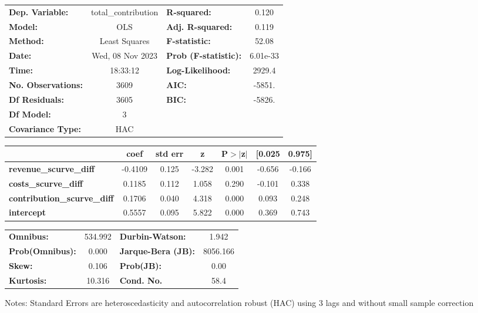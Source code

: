 \begin{center}
\begin{tabular}{lclc}
\toprule
\textbf{Dep. Variable:}             & total\_contribution & \textbf{  R-squared:         } &     0.120   \\
\textbf{Model:}                     &         OLS         & \textbf{  Adj. R-squared:    } &     0.119   \\
\textbf{Method:}                    &    Least Squares    & \textbf{  F-statistic:       } &     52.08   \\
\textbf{Date:}                      &   Wed, 08 Nov 2023  & \textbf{  Prob (F-statistic):} &  6.01e-33   \\
\textbf{Time:}                      &       18:33:12      & \textbf{  Log-Likelihood:    } &    2929.4   \\
\textbf{No. Observations:}          &          3609       & \textbf{  AIC:               } &    -5851.   \\
\textbf{Df Residuals:}              &          3605       & \textbf{  BIC:               } &    -5826.   \\
\textbf{Df Model:}                  &             3       & \textbf{                     } &             \\
\textbf{Covariance Type:}           &         HAC         & \textbf{                     } &             \\
\bottomrule
\end{tabular}
\begin{tabular}{lcccccc}
                                    & \textbf{coef} & \textbf{std err} & \textbf{z} & \textbf{P$> |$z$|$} & \textbf{[0.025} & \textbf{0.975]}  \\
\midrule
\textbf{revenue\_scurve\_diff}      &      -0.4109  &        0.125     &    -3.282  &         0.001        &       -0.656    &       -0.166     \\
\textbf{costs\_scurve\_diff}        &       0.1185  &        0.112     &     1.058  &         0.290        &       -0.101    &        0.338     \\
\textbf{contribution\_scurve\_diff} &       0.1706  &        0.040     &     4.318  &         0.000        &        0.093    &        0.248     \\
\textbf{intercept}                  &       0.5557  &        0.095     &     5.822  &         0.000        &        0.369    &        0.743     \\
\bottomrule
\end{tabular}
\begin{tabular}{lclc}
\textbf{Omnibus:}       & 534.992 & \textbf{  Durbin-Watson:     } &    1.942  \\
\textbf{Prob(Omnibus):} &   0.000 & \textbf{  Jarque-Bera (JB):  } & 8056.166  \\
\textbf{Skew:}          &   0.106 & \textbf{  Prob(JB):          } &     0.00  \\
\textbf{Kurtosis:}      &  10.316 & \textbf{  Cond. No.          } &     58.4  \\
\bottomrule
\end{tabular}
\end{center}

Notes: \newline
 [1] Standard Errors are heteroscedasticity and autocorrelation robust (HAC) using 3 lags and without small sample correction